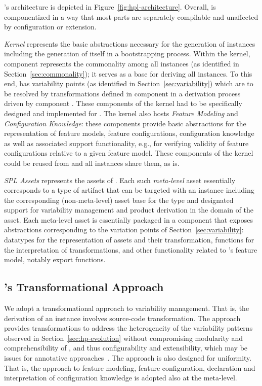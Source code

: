 \hpl's architecture is depicted in Figure~\ref{fig:hpl-architecture}. Overall, \hpl{} is componentized in a way that most parts are separately compilable and unaffected by configuration or extension.

\emph{Kernel} represents the basic abstractions necessary for the generation of \hpl{} instances including the generation of \hpl{} itself in a bootstrapping process. Within the kernel, component \hpbase{} represents the commonality among all \hpl{} instances (as identified in Section~\ref{sec:commonality}); it serves as a base for deriving all \hpl{} instances. To this end, \hpbase{} has variability points (as identified in Section~\ref{sec:variability}) which are to be resolved by transformations defined in component \hpsplasset{} in a derivation process driven by component \hpproduct. These components of the kernel had to be specifically designed and implemented for \hpl. The kernel also hosts \emph{Feature Modeling} and \emph{Configuration Knowledge}: these components provide
basic abstractions for the representation of feature models, feature configurations, configuration knowledge as well as associated support functionality, e.g., for verifying validity of feature configurations relative to a given feature model. These components of the kernel could be reused from \hp{} and all \hpl{} instances share them, as is.

\textit{SPL Assets} represents the assets of \hpl. Each such \emph{meta-level} asset essentially corresponds to a type of artifact that can be targeted with an \hpl{} instance including the corresponding (non-meta-level) asset base for the type and designated support for variability management and product derivation in the domain of the asset. Each meta-level asset is essentially packaged in a component that exposes abstractions corresponding to the variation points of Section~\ref{sec:variability}: datatypes for the representation of assets and their transformation, functions for the interpretation of transformations, and other functionality related to \hpl's feature model, notably export functions.


\subsection{\hpl's Transformational Approach} 
\label{sec:hpl-transformation}

We adopt a transformational approach to variability management. That is, the derivation of an \hpl{} instance involves source-code transformation. The approach provides transformations to address the heterogeneity of the variability patterns observed in Section~\ref{sec:hp-evolution} without compromising modularity and comprehensibility of \hpl, and thus configurability and extensibility, which may be issues for annotative approaches~\cite{kastner:2008}. The approach is also designed for uniformity. That is, the \hp{} approach to feature modeling, feature configuration, declaration and interpretation of configuration knowledge is adopted also at the meta-level. 

